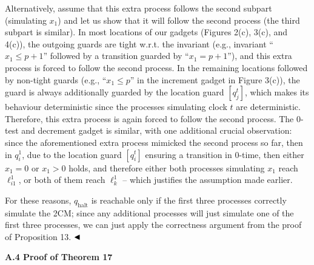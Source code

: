 \documentclass[10pt,a4paper]{article}
\begin{document}
 
 
Alternatively, assume that this extra process follows the second subpart (simulating $x_{1}$) and let us show that it will follow the second process (the third subpart is similar). In most locations of our gadgets (Figures 2(c), 3(c), and 4(c)), the outgoing guards are tight w.r.t. the invariant (e.g., invariant “$x_{1}\leq p+1$” followed by a transition guarded by “$x_{1}=p+1$”), and this extra process is forced to follow the second process. In the remaining locations followed by non-tight guards (e.g., “$x_{1}\leq p$” in the increment gadget in Figure 3(c)), the guard is always additionally guarded by the location guard $[q_{j}^{t}]$, which makes its behaviour deterministic since the processes simulating clock $t$ are deterministic. Therefore, this extra process is again forced to follow the second process. The 0-test and decrement gadget is similar, with one additional crucial observation: since the aforementioned extra process mimicked the second process so far, then in $q_{i}^{1}$, due to the location guard $[q_{i}^{t}]$ ensuring a transition in 0-time, then either $x_{1}=0$ or $x_{1}>0$ holds, and therefore either both processes simulating $x_{1}$ reach $\mathrm{\mathrm{\ell}}_{i1}^{1}$, or both of them reach $\mathrm{\mathrm{\ell}}_{k}^{1}$ -- which justifies the assumption made earlier.\par
 
 
 
For these reasons, $q_{\textrm{halt}}$ is reachable only if the first three processes correctly simulate the 2CM; since any additional processes will just simulate one of the first three processes, we can just apply the correctness argument from the proof of Proposition 13. $\hfill\blacktriangleleft$\par
 
 
 
 
 
\par\medskip\noindent\textbf{A.4 Proof of Theorem 17}\par
 
 
 
\end{document}
